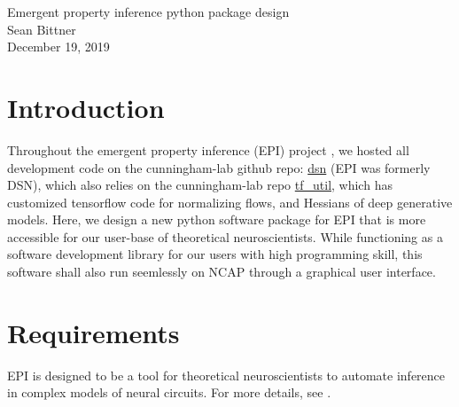 \documentclass[11pt]{article}
\begin{document}
\medskip                        %

\thispagestyle{plain}
\begin{center}                  %
{\Large Emergent property inference python package design} \\
Sean Bittner \\
December 19, 2019 \\
\end{center}

\section{Introduction}
Throughout the emergent property inference (EPI) project \cite{bittner2019interrogating}, we hosted all development code on the cunningham-lab github repo: \href{https://github.com/cunningham-lab/dsn}{dsn} (EPI was formerly DSN), which also relies on the cunningham-lab repo \href{https://github.com/cunningham-lab/tf_util}{tf\_util}, which has customized tensorflow code for normalizing flows, and Hessians of deep generative models.  
Here, we design a new python software package for EPI that is more accessible for our user-base of theoretical neuroscientists. 
While functioning as a software development library for our users with high programming skill, this software shall also run seemlessly on NCAP through a graphical user interface.

\section{Requirements}
EPI is designed to be a tool for theoretical neuroscientists to automate inference in complex models of neural circuits.  For more details, see \cite{bittner2019interrogating}.
\end{document}
